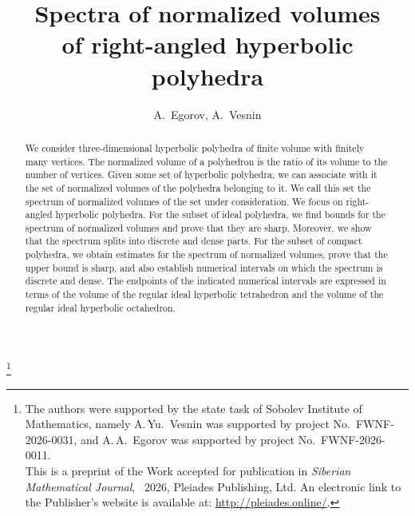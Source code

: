 \documentclass{amsart}
\begin{document}
	
\title[Spectra of normalized volumes]{Spectra of normalized volumes \\ of right-angled hyperbolic polyhedra}

\author[A.~Egorov, A.~Vesnin]{A.~Egorov, A.~Vesnin} 
\address{Sobolev Institute of Mathematics, Novosibirsk, Russia} 

\address{Sobolev Institute of Mathematics, Novosibirsk, Russia}



\begin{abstract} 
We consider three-dimensional hyperbolic polyhedra of finite volume with finitely many
vertices. The normalized volume of a polyhedron is the ratio of its volume to the number of vertices.
Given some set of hyperbolic polyhedra, we can associate with it the set of normalized volumes of
the polyhedra belonging to it. We call this set the spectrum of normalized volumes of the set under
consideration. We focus on right-angled hyperbolic polyhedra. For the subset of ideal polyhedra,
we find bounds for the spectrum of normalized volumes and prove that they are sharp. Moreover,
we show that the spectrum splits into discrete and dense parts. For the subset of compact polyhedra,
we obtain estimates for the spectrum of normalized volumes, prove that the upper bound is sharp,
and also establish numerical intervals on which the spectrum is discrete and dense. The endpoints of
the indicated numerical intervals are expressed in terms of the volume of the regular ideal hyperbolic
tetrahedron and the volume of the regular ideal hyperbolic octahedron.
\end{abstract}




\thanks{The authors were supported by the state task of Sobolev Institute of Mathematics, namely A.\,Yu.~Vesnin was supported by project No.~FWNF-2026-0031, and A.\,A.~Egorov was supported by project No.~FWNF-2026-0011. \\ This is a preprint of the Work accepted for publication in \textit{Siberian Mathematical Journal}, \textcopyright\ 2026, Pleiades Publishing, Ltd. An electronic link to the Publisher's website is available at: \url{http://pleiades.online/}.}
\end{document}
